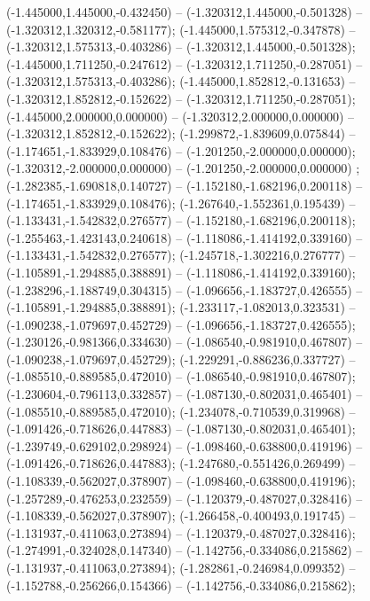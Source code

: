  (-1.445000,1.445000,-0.432450) -- (-1.320312,1.445000,-0.501328) -- (-1.320312,1.320312,-0.581177);
 (-1.445000,1.575312,-0.347878) -- (-1.320312,1.575313,-0.403286) -- (-1.320312,1.445000,-0.501328);
 (-1.445000,1.711250,-0.247612) -- (-1.320312,1.711250,-0.287051) -- (-1.320312,1.575313,-0.403286);
 (-1.445000,1.852812,-0.131653) -- (-1.320312,1.852812,-0.152622) -- (-1.320312,1.711250,-0.287051);
 (-1.445000,2.000000,0.000000) -- (-1.320312,2.000000,0.000000) -- (-1.320312,1.852812,-0.152622);
 (-1.299872,-1.839609,0.075844) -- (-1.174651,-1.833929,0.108476) -- (-1.201250,-2.000000,0.000000);
 (-1.320312,-2.000000,0.000000) -- (-1.201250,-2.000000,0.000000) ;
 (-1.282385,-1.690818,0.140727) -- (-1.152180,-1.682196,0.200118) -- (-1.174651,-1.833929,0.108476);
 (-1.267640,-1.552361,0.195439) -- (-1.133431,-1.542832,0.276577) -- (-1.152180,-1.682196,0.200118);
 (-1.255463,-1.423143,0.240618) -- (-1.118086,-1.414192,0.339160) -- (-1.133431,-1.542832,0.276577);
 (-1.245718,-1.302216,0.276777) -- (-1.105891,-1.294885,0.388891) -- (-1.118086,-1.414192,0.339160);
 (-1.238296,-1.188749,0.304315) -- (-1.096656,-1.183727,0.426555) -- (-1.105891,-1.294885,0.388891);
 (-1.233117,-1.082013,0.323531) -- (-1.090238,-1.079697,0.452729) -- (-1.096656,-1.183727,0.426555);
 (-1.230126,-0.981366,0.334630) -- (-1.086540,-0.981910,0.467807) -- (-1.090238,-1.079697,0.452729);
 (-1.229291,-0.886236,0.337727) -- (-1.085510,-0.889585,0.472010) -- (-1.086540,-0.981910,0.467807);
 (-1.230604,-0.796113,0.332857) -- (-1.087130,-0.802031,0.465401) -- (-1.085510,-0.889585,0.472010);
 (-1.234078,-0.710539,0.319968) -- (-1.091426,-0.718626,0.447883) -- (-1.087130,-0.802031,0.465401);
 (-1.239749,-0.629102,0.298924) -- (-1.098460,-0.638800,0.419196) -- (-1.091426,-0.718626,0.447883);
 (-1.247680,-0.551426,0.269499) -- (-1.108339,-0.562027,0.378907) -- (-1.098460,-0.638800,0.419196);
 (-1.257289,-0.476253,0.232559) -- (-1.120379,-0.487027,0.328416) -- (-1.108339,-0.562027,0.378907);
 (-1.266458,-0.400493,0.191745) -- (-1.131937,-0.411063,0.273894) -- (-1.120379,-0.487027,0.328416);
 (-1.274991,-0.324028,0.147340) -- (-1.142756,-0.334086,0.215862) -- (-1.131937,-0.411063,0.273894);
 (-1.282861,-0.246984,0.099352) -- (-1.152788,-0.256266,0.154366) -- (-1.142756,-0.334086,0.215862);
